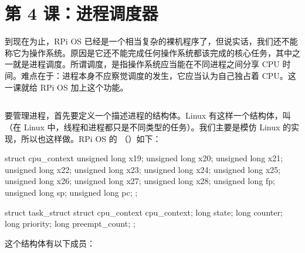 \section{第 4 课：进程调度器}
\label{sec:rpios-l4}

到现在为止，RPi OS 已经是一个相当复杂的裸机程序了，但说实话，我们还不能称它为操作系统。原因是它还不能完成任何操作系统都该完成的核心任务，其中之一就是进程调度。所谓调度，是指操作系统应当能在不同进程之间分享 CPU 时间。难点在于：进程本身不应察觉调度的发生，它应当认为自己独占着 CPU。这一课就给 RPi OS 加上这个功能。

\subsection{}

要管理进程，首先要定义一个描述进程的结构体。Linux 有这样一个结构体，叫 （在 Linux 中，线程和进程都只是不同类型的任务）。我们主要是模仿 Linux 的实现，所以也这样做。RPi OS 的 （）如下：

\begin{ccode}
struct cpu_context {
	unsigned long x19;
	unsigned long x20;
	unsigned long x21;
	unsigned long x22;
	unsigned long x23;
	unsigned long x24;
	unsigned long x25;
	unsigned long x26;
	unsigned long x27;
	unsigned long x28;
	unsigned long fp;
	unsigned long sp;
	unsigned long pc;
};

struct task_struct {
	struct cpu_context cpu_context;
	long state;
	long counter;
	long priority;
	long preempt_count;
};
\end{ccode}

这个结构体有以下成员：

